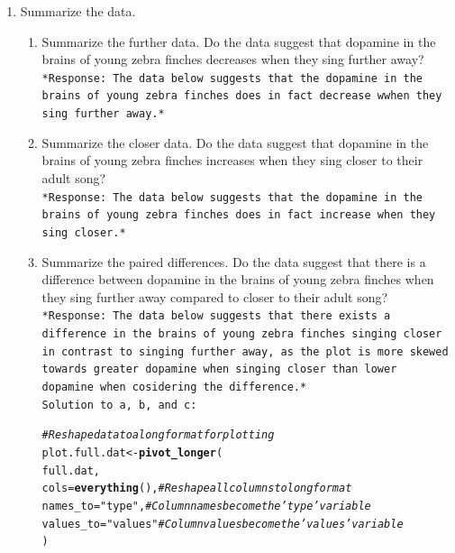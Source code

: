 \documentclass{article}\usepackage[]{graphicx}\usepackage[]{xcolor}
\makeatletter
\newcommand{\hlsng}[1]{\textcolor[rgb]{0.192,0.494,0.8}{#1}}%
\newcommand{\hlcom}[1]{\textcolor[rgb]{0.678,0.584,0.686}{\textit{#1}}}%
\newcommand{\hldef}[1]{\textcolor[rgb]{0.345,0.345,0.345}{#1}}%
\newcommand{\hlkwb}[1]{\textcolor[rgb]{0.69,0.353,0.396}{#1}}%
\newcommand{\hlkwc}[1]{\textcolor[rgb]{0.333,0.667,0.333}{#1}}%
\newcommand{\hlkwd}[1]{\textcolor[rgb]{0.737,0.353,0.396}{\textbf{#1}}}%
\newenvironment{kframe}{%
 \def\at@end@of@kframe{}%
 \ifinner\ifhmode%
  \def\at@end@of@kframe{\end{minipage}}%
  \begin{minipage}{\columnwidth}%
 \fi\fi%
 \def\FrameCommand##1{\hskip\@totalleftmargin \hskip-\fboxsep
 \colorbox{shadecolor}{##1}\hskip-\fboxsep
     \hskip-\linewidth \hskip-\@totalleftmargin \hskip\columnwidth}%
 \MakeFramed {\advance\hsize-\width
   \@totalleftmargin\z@ \linewidth\hsize
   \@setminipage}}%
 {\par\unskip\endMakeFramed%
 \at@end@of@kframe}
\newenvironment{knitrout}{}{} %
\makeatother
\begin{document}
\begin{enumerate}
\item Summarize the data.
\begin{enumerate}
  \item Summarize the further data. Do the data suggest that
   dopamine in the brains of young zebra finches decreases when
   they sing further away? \\
\texttt{*Response: The data below suggests that the dopamine in the brains of young zebra finches does in fact decrease wwhen they sing further away.*}
   \item Summarize the closer data. Do the data suggest that
   dopamine in the brains of young zebra finches increases when
   they sing closer to their adult song? \\
\texttt{*Response: The data below suggests that the dopamine in the brains of young zebra finches does in fact increase when they sing closer.*}
  \item Summarize the paired differences. Do the data suggest
  that there is a difference between dopamine in the brains of
  young zebra finches when they sing further away compared to 
  closer to their adult song? \\
\texttt{*Response: The data below suggests that there exists a difference in the brains of young zebra finches singing closer in contrast to singing further away, as the plot is more skewed towards greater dopamine when singing closer than lower dopamine when cosidering the difference.*} \\

  \texttt{Solution to a, b, and c:}
\begin{knitrout}\scriptsize
{}\color{fgcolor}\begin{kframe}
\begin{alltt}
\hlcom{# Reshape data to a long format for plotting}
\hldef{plot.full.dat} \hlkwb{<-} \hlkwd{pivot_longer}\hldef{(}
  \hldef{full.dat,}
  \hlkwc{cols} \hldef{=} \hlkwd{everything}\hldef{(),}       \hlcom{# Reshape all columns to long format}
  \hlkwc{names_to} \hldef{=} \hlsng{"type"}\hldef{,}         \hlcom{# Column names become the 'type' variable}
  \hlkwc{values_to} \hldef{=} \hlsng{"values"}       \hlcom{# Column values become the 'values' variable}
\hldef{)}


\end{alltt}
\end{kframe}
\end{knitrout}
\end{enumerate}
\end{enumerate}
\end{document}
